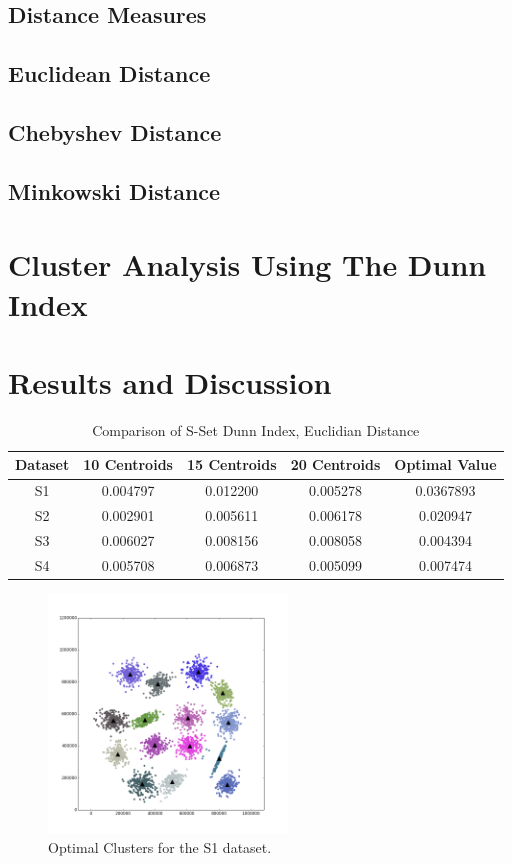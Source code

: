 \documentclass[journal]{IEEEtran}
\begin{document}
\subsection{Distance Measures}

\subsection{Euclidean Distance}

\subsection{Chebyshev Distance}

\subsection{Minkowski Distance}
\section{Cluster Analysis Using The Dunn Index}



\section{Results and Discussion}
\begin{table}[h]
	\renewcommand{\arraystretch}{1.3}
	
	\caption{Comparison of S-Set Dunn Index, Euclidian Distance}
	\label{table_example}
	\centering
	
	\begin{tabular}{|c|c|c|c|c|}
		\hline
		Dataset & 10 Centroids & 15 Centroids & 20 Centroids & Optimal Value\\
		\hline
		
		S1 & 0.004797  & 0.012200 & 0.005278 & 0.0367893\\
		\hline
		S2 & 0.002901 & 0.005611 & 0.006178 & 0.020947\\
		\hline
		S3 & 0.006027 & 0.008156 & 0.008058 & 0.004394\\
		\hline
		S4 & 0.005708 & 0.006873 & 0.005099 & 0.007474\\
		\hline
	\end{tabular}
\end{table}

\begin{figure}[!t]
\centering
\includegraphics[width=2.5in]{../figs/s1_true_euclid_15.png}
\caption{Optimal Clusters for the S1 dataset.}
\label{fig_sim}
\end{figure}
\end{document}
